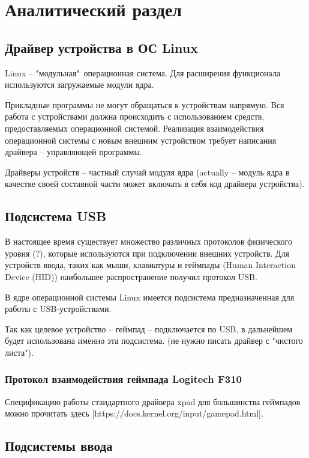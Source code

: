 \section{Аналитический раздел}

\subsection{Драйвер устройства в ОС Linux}

Linux -- "модульная"\, операционная система. Для расширения функционала используются загружаемые модули ядра.

Прикладные программы не могут обращаться к устройствам напрямую. Вся работа с устройствами должна происходить с использованием средств, предоставляемых операционной системой. Реализация взаимодействия операционной системы с новым внешним устройством требует написания драйвера -- управляющей программы.

Драйверы устройств -- частный случай модуля ядра (actually -- модуль ядра в качестве своей составной части может включать в себя код драйвера устройства).

\subsection{Подсистема USB}

В настоящее время существует множество различных протоколов физического уровня (?), которые используются при подключении внешних устройств. Для устройств ввода, таких как мыши, клавиатуры и геймпады (Human Interaction Device (HID)) наибольшее распространение получил протокол USB.

В ядре операционной системы Linux имеется подсистема предназначенная для работы с USB-устройствами.

Так как целевое устройство -- геймпад -- подключается по USB, в дальнейшем будет использована именно эта подсистема. (не нужно писать драйвер с "чистого листа").

\subsubsection{Протокол взаимодействия геймпада Logitech F310}

Спецификацию работы стандартного драйвера xpad для большинства геймпадов можно прочитать здесь [https://docs.kernel.org/input/gamepad.html].

\subsection{Подсистемы ввода}

